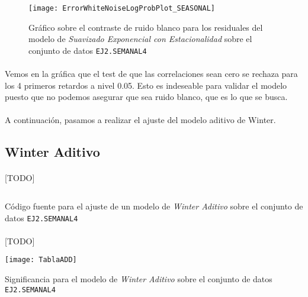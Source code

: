 \documentclass[a4paper, spanish]{article}
\begin{document}
      \begin{figure}[htb!]
        \centering
        \texttt{[image: ErrorWhiteNoiseLogProbPlot\_SEASONAL]}
        \caption{Gráfico sobre el contraste de ruido blanco para los residuales del modelo de \emph{Suavizado Exponencial con Estacionalidad} sobre el conjunto de datos \texttt{EJ2.SEMANAL4}}
        \label{img:b_seasonal_test_white_noise}
      \end{figure}

      \paragraph{}
      Vemos en la gráfica que el test de que las correlaciones sean cero se rechaza para los 4 primeros retardos a nivel 0.05. Esto es indeseable para validar el modelo puesto que no podemos asegurar que sea ruido blanco, que es lo que se busca.

      \paragraph{}
      A continuación, pasamos a realizar el ajuste del modelo aditivo de Winter.

    \subsection{Winter Aditivo}

      \paragraph{}
      [TODO]

      \begin{listing}[htb!]
        \centering
        \inputminted{SAS}{./res/code/b-01-esm-winteradd.sas}
        \caption{Código fuente para el ajuste de un modelo de \emph{Winter Aditivo} sobre el conjunto de datos \texttt{EJ2.SEMANAL4}}
        \label{code:b_winter_additive_esm}
      \end{listing}

      \paragraph{}
      [TODO]

      \begin{table}[htb!]
        \centering
        \texttt{[image: TablaADD]}
        \caption{Significancia para el modelo de \emph{Winter Aditivo} sobre el conjunto de datos \texttt{EJ2.SEMANAL4}}
        \label{table:b_winter_additive_significance}
      \end{table}
\end{document}
